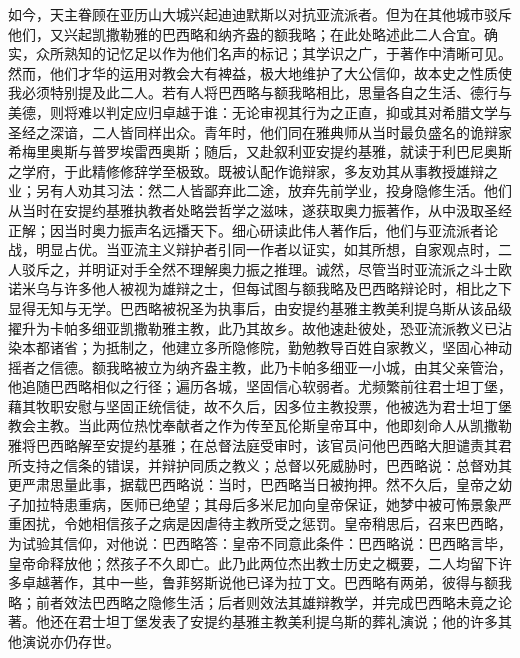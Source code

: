 如今，天主眷顾在亚历山大城兴起迪迪默斯以对抗亚流派者。但为在其他城市驳斥他们，又兴起凯撒勒雅的巴西略和纳齐盎的额我略；在此处略述此二人合宜。确实，众所熟知的记忆足以作为他们名声的标记；其学识之广，于著作中清晰可见。然而，他们才华的运用对教会大有裨益，极大地维护了大公信仰，故本史之性质使我必须特别提及此二人。若有人将巴西略与额我略相比，思量各自之生活、德行与美德，则将难以判定应归卓越于谁：无论审视其行为之正直，抑或其对希腊文学与圣经之深谙，二人皆同样出众。青年时，他们同在雅典师从当时最负盛名的诡辩家希梅里奥斯与普罗埃雷西奥斯；随后，又赴叙利亚安提约基雅，就读于利巴尼奥斯之学府，于此精修修辞学至极致。既被认配作诡辩家，多友劝其从事教授雄辩之业；另有人劝其习法：然二人皆鄙弃此二途，放弃先前学业，投身隐修生活。他们从当时在安提约基雅执教者处略尝哲学之滋味，遂获取奥力振著作，从中汲取圣经正解；因当时奥力振声名远播天下。细心研读此伟人著作后，他们与亚流派者论战，明显占优。当亚流主义辩护者引同一作者以证实，如其所想，自家观点时，二人驳斥之，并明证对手全然不理解奥力振之推理。诚然，尽管当时亚流派之斗士欧诺米乌与许多他人被视为雄辩之士，但每试图与额我略及巴西略辩论时，相比之下显得无知与无学。巴西略被祝圣为执事后，由安提约基雅主教美利提乌斯从该品级擢升为卡帕多细亚凯撒勒雅主教，此乃其故乡。故他速赴彼处，恐亚流派教义已沾染本都诸省；为抵制之，他建立多所隐修院，勤勉教导百姓自家教义，坚固心神动摇者之信德。额我略被立为纳齐盎主教，此乃卡帕多细亚一小城，由其父亲管治，他追随巴西略相似之行径；遍历各城，坚固信心软弱者。尤频繁前往君士坦丁堡，藉其牧职安慰与坚固正统信徒，故不久后，因多位主教投票，他被选为君士坦丁堡教会主教。当此两位热忱奉献者之作为传至瓦伦斯皇帝耳中，他即刻命人从凯撒勒雅将巴西略解至安提约基雅；在总督法庭受审时，该官员问他巴西略大胆谴责其君所支持之信条的错误，并辩护同质之教义；总督以死威胁时，巴西略说：总督劝其更严肃思量此事，据载巴西略说：当时，巴西略当日被拘押。然不久后，皇帝之幼子加拉特患重病，医师已绝望；其母后多米尼加向皇帝保证，她梦中被可怖景象严重困扰，令她相信孩子之病是因虐待主教所受之惩罚。皇帝稍思后，召来巴西略，为试验其信仰，对他说：巴西略答：皇帝不同意此条件：巴西略说：巴西略言毕，皇帝命释放他；然孩子不久即亡。此乃此两位杰出教士历史之概要，二人均留下许多卓越著作，其中一些，鲁菲努斯说他已译为拉丁文。巴西略有两弟，彼得与额我略；前者效法巴西略之隐修生活；后者则效法其雄辩教学，并完成巴西略未竟之论著。他还在君士坦丁堡发表了安提约基雅主教美利提乌斯的葬礼演说；他的许多其他演说亦仍存世。\par

